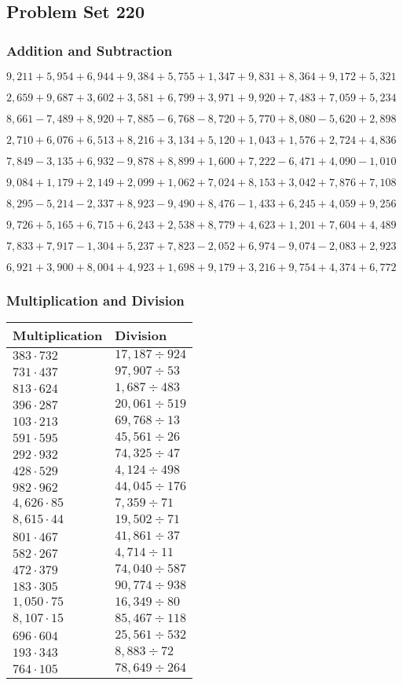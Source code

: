 \hypertarget{problem-set-220}{%
\subsection{Problem Set 220}\label{problem-set-220}}

\hypertarget{addition-and-subtraction}{%
\subsubsection{Addition and
Subtraction}\label{addition-and-subtraction}}

\(9,211+5,954+6,944+9,384+5,755+1,347+9,831+8,364+9,172+5,321\)

\(2,659+9,687+3,602+3,581+6,799+3,971+9,920+7,483+7,059+5,234\)

\(8,661-7,489+8,920+7,885-6,768-8,720+5,770+8,080-5,620+2,898\)

\(2,710+6,076+6,513+8,216+3,134+5,120+1,043+1,576+2,724+4,836\)

\(7,849-3,135+6,932-9,878+8,899+1,600+7,222-6,471+4,090-1,010\)

\(9,084+1,179+2,149+2,099+1,062+7,024+8,153+3,042+7,876+7,108\)

\(8,295-5,214-2,337+8,923-9,490+8,476-1,433+6,245+4,059+9,256\)

\(9,726+5,165+6,715+6,243+2,538+8,779+4,623+1,201+7,604+4,489\)

\(7,833+7,917-1,304+5,237+7,823-2,052+6,974-9,074-2,083+2,923\)

\(6,921+3,900+8,004+4,923+1,698+9,179+3,216+9,754+4,374+6,772\)

\hypertarget{multiplication-and-division}{%
\subsubsection{Multiplication and
Division}\label{multiplication-and-division}}

\begin{longtable}[]{@{}ll@{}}
\toprule
Multiplication & Division\tabularnewline
\midrule
\endhead
\(383\cdot732\) & \(17,187÷924\)\tabularnewline
\(731\cdot437\) & \(97,907÷53\)\tabularnewline
\(813\cdot624\) & \(1,687÷483\)\tabularnewline
\(396\cdot287\) & \(20,061÷519\)\tabularnewline
\(103\cdot213\) & \(69,768÷13\)\tabularnewline
\(591\cdot595\) & \(45,561÷26\)\tabularnewline
\(292\cdot932\) & \(74,325÷47\)\tabularnewline
\(428\cdot529\) & \(4,124÷498\)\tabularnewline
\(982\cdot962\) & \(44,045÷176\)\tabularnewline
\(4,626\cdot85\) & \(7,359÷71\)\tabularnewline
\(8,615\cdot44\) & \(19,502÷71\)\tabularnewline
\(801\cdot467\) & \(41,861÷37\)\tabularnewline
\(582\cdot267\) & \(4,714÷11\)\tabularnewline
\(472\cdot379\) & \(74,040÷587\)\tabularnewline
\(183\cdot305\) & \(90,774÷938\)\tabularnewline
\(1,050\cdot75\) & \(16,349÷80\)\tabularnewline
\(8,107\cdot15\) & \(85,467÷118\)\tabularnewline
\(696\cdot604\) & \(25,561÷532\)\tabularnewline
\(193\cdot343\) & \(8,883÷72\)\tabularnewline
\(764\cdot105\) & \(78,649÷264\)\tabularnewline
\bottomrule
\end{longtable}
